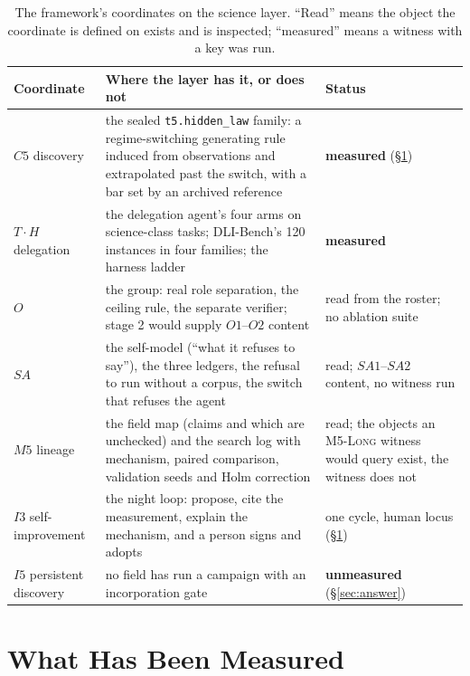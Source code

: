\begin{table}[!htbp]
\centering\small
\begin{tabularx}{\textwidth}{@{}>{\raggedright\arraybackslash}p{2.6cm}Y>{\raggedright\arraybackslash}p{3.2cm}@{}}
\toprule
Coordinate & Where the layer has it, or does not & Status \\
\midrule
$C5$ discovery & the sealed \texttt{t5.hidden\_\allowbreak law} family: a regime-switching generating rule induced from observations and extrapolated past the switch, with a bar set by an archived reference & \textbf{measured} (\S\ref{sec:measured}) \\
$T\cdot H$ delegation & the delegation agent's four arms on science-class tasks; DLI-Bench's 120 instances in four families; the harness ladder & \textbf{measured} \\
$O$ & the group: real role separation, the ceiling rule, the separate verifier; stage 2 would supply $O1$--$O2$ content & read from the roster; no ablation suite \\
$SA$ & the self-model (``what it refuses to say''), the three ledgers, the refusal to run without a corpus, the switch that refuses the agent & read; $SA1$--$SA2$ content, no witness run \\
$M5$ lineage & the field map (claims and which are unchecked) and the search log with mechanism, paired comparison, validation seeds and Holm correction & read; the objects an \textsc{M5-Long} witness would query exist, the witness does not \\
$I3$ self-improvement & the night loop: propose, cite the measurement, explain the mechanism, and a person signs and adopts & one cycle, human locus (\S\ref{sec:measured}) \\
$I5$ persistent discovery & no field has run a campaign with an incorporation gate & \textbf{unmeasured} (\S\ref{sec:answer}) \\
\bottomrule
\end{tabularx}
\caption{The framework's coordinates on the science layer. ``Read'' means the object the coordinate is defined on exists and is inspected; ``measured'' means a witness with a key was run.}
\label{tab:coords}
\end{table}

\section{What Has Been Measured}\label{sec:measured}


